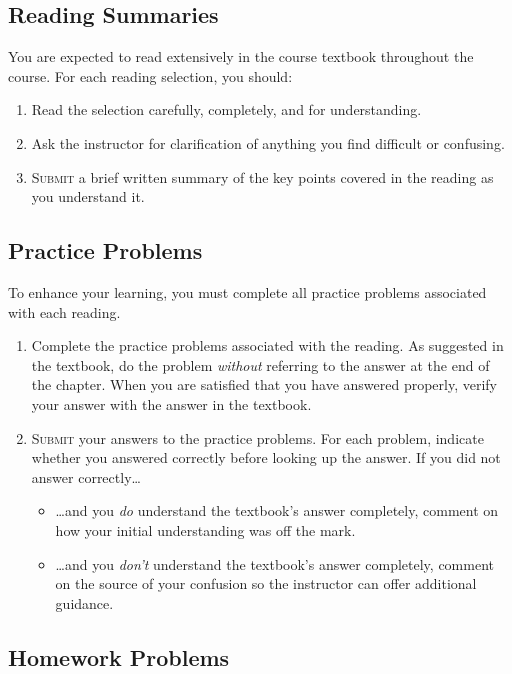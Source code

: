\documentclass[11pt]{article}
\newcommand{\submit}{\textsc{Submit}}
\begin{document}
\subsection{Reading Summaries}

You are expected to read extensively in the course textbook
throughout the course.
For each reading selection, you should:
\begin{enumerate}
\item
  Read the selection carefully, completely, and for understanding.
\item
  Ask the instructor for clarification of anything you find
  difficult or confusing.
\item
  \submit{} a brief written summary of the key points covered in the reading
  as you understand it.
\end{enumerate}

\subsection{Practice Problems}

To enhance your learning,
you must complete all practice problems
associated with each reading.
\begin{enumerate}
\item
  Complete the practice problems associated with the reading.
  As suggested in the textbook,
  do the problem \emph{without} referring to the answer at the end of the chapter.
  When you are satisfied that you have answered properly,
  verify your answer with the answer in the textbook.
\item
  \submit{} your answers to the practice problems.
  For each problem,
  indicate whether you answered correctly before looking up the answer.
  If you did not answer correctly\ldots
  \begin{itemize}
  \item
    \ldots and you \emph{do} understand the textbook's answer completely,
    comment on how your initial understanding was off the mark.
  \item
    \ldots and you \emph{don't} understand the textbook's answer completely,
    comment on the source of your confusion
    so the instructor can offer additional guidance.
  \end{itemize}
\end{enumerate}

\subsection{Homework Problems}
\end{document}

